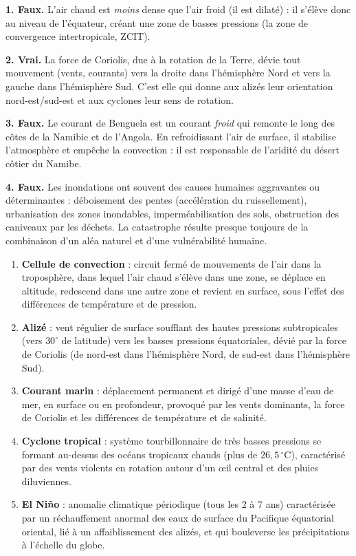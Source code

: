 \documentclass[11pt]{article}
\newcommand{\cle}[1]{{\popxbold\color{popdark}#1}}
\begin{document}
\begin{corrige}
\textbf{1. Faux.} L'air chaud est \emph{moins} dense que l'air froid (il est dilaté) : il s'élève donc au niveau de l'équateur, créant une zone de basses pressions (la zone de convergence intertropicale, ZCIT).

\textbf{2. Vrai.} La force de Coriolis, due à la rotation de la Terre, dévie tout mouvement (vents, courants) vers la droite dans l'hémisphère Nord et vers la gauche dans l'hémisphère Sud. C'est elle qui donne aux alizés leur orientation nord-est/sud-est et aux cyclones leur sens de rotation.

\textbf{3. Faux.} Le courant de \cle{Benguela} est un courant \emph{froid} qui remonte le long des côtes de la Namibie et de l'Angola. En refroidissant l'air de surface, il stabilise l'atmosphère et empêche la convection : il est responsable de l'aridité du désert côtier du Namibe.

\textbf{4. Faux.} Les inondations ont souvent des causes humaines aggravantes ou déterminantes : déboisement des pentes (accélération du ruissellement), urbanisation des zones inondables, imperméabilisation des sols, obstruction des caniveaux par les déchets. La catastrophe résulte presque toujours de la combinaison d'un aléa naturel et d'une vulnérabilité humaine.
\end{corrige}

\begin{corrige}
\begin{enumerate}
\item \textbf{Cellule de convection} : circuit fermé de mouvements de l'air dans la troposphère, dans lequel l'air chaud s'élève dans une zone, se déplace en altitude, redescend dans une autre zone et revient en surface, sous l'effet des différences de température et de pression.
\item \textbf{Alizé} : vent régulier de surface soufflant des hautes pressions subtropicales (vers $30^\circ$ de latitude) vers les basses pressions équatoriales, dévié par la force de Coriolis (de nord-est dans l'hémisphère Nord, de sud-est dans l'hémisphère Sud).
\item \textbf{Courant marin} : déplacement permanent et dirigé d'une masse d'eau de mer, en surface ou en profondeur, provoqué par les vents dominants, la force de Coriolis et les différences de température et de salinité.
\item \textbf{Cyclone tropical} : système tourbillonnaire de très basses pressions se formant au-dessus des océans tropicaux chauds (plus de $26,5\,^\circ$C), caractérisé par des vents violents en rotation autour d'un \oe il central et des pluies diluviennes.
\item \textbf{El Niño} : anomalie climatique périodique (tous les 2 à 7 ans) caractérisée par un réchauffement anormal des eaux de surface du Pacifique équatorial oriental, lié à un affaiblissement des alizés, et qui bouleverse les précipitations à l'échelle du globe.
\end{enumerate}
\end{corrige}
\end{document}
